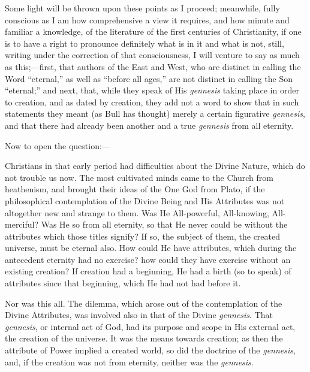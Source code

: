 Some light will be thrown upon these points as I proceed;
meanwhile, fully conscious as I am how comprehensive a view it
requires, and how minute and familiar a knowledge, of the literature
of the first centuries of Christianity, if one is to have a right to
pronounce definitely what is in it and what is not, still,
writing under the correction of that consciousness, I will venture to
say as much as this;—first, that authors of the East and West, who
are distinct in calling the Word ``eternal,'' as well as
``before all ages,'' are not distinct in calling the Son
``eternal;'' and next, that, while they speak of His \emph{gennesis}
taking place in order to creation, and as dated by creation, they add
not a word to show that in such statements they meant (as Bull has
thought) merely a certain figurative \emph{gennesis}, and that there
had already been another and a true \emph{gennesis} from all eternity.

Now to open the question:—

Christians in that early period had difficulties about the Divine
Nature, which do not trouble us now. The most cultivated minds came to
the Church from heathenism, and brought their ideas of the One God
from Plato, if the philosophical contemplation of the Divine Being and
His Attributes was not altogether new and strange to them. Was He
All-powerful, All-knowing, All-merciful? Was He so from all eternity,
so that He never could be without the attributes which those titles
signify? If so, the subject of them, the created universe, must be
eternal also. How could He have attributes, which during the
antecedent eternity had no exercise? how could they have exercise
without an existing creation? If creation had a beginning, He had a
birth (so to speak) of attributes since that beginning, which He had
not had before it.

Nor was this all. The dilemma, which arose out of the contemplation
of the Divine Attributes, was involved also in that of the Divine \emph{gennesis}.
That \emph{gennesis}, or internal act of God, had its purpose
and scope in His external act, the creation of the universe. It was
the means towards creation; as then the attribute of Power implied a
created world, so did the doctrine of the \emph{gennesis}, and, if the
creation was not from eternity, neither was the \emph{gennesis}.

